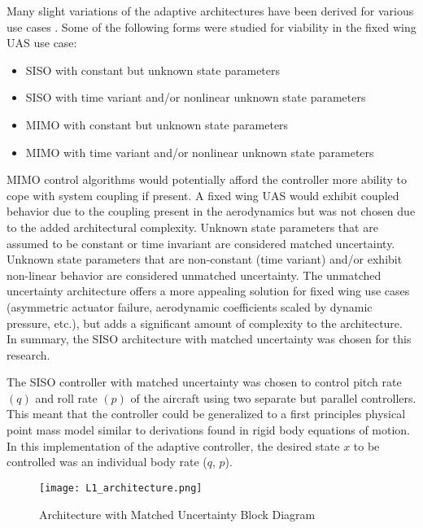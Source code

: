 Many slight variations of the \Lone adaptive architectures have been derived for various use cases \cite{hovakimyan2010l1}.  Some of the following forms were studied for viability in the fixed wing \ac{UAS} use case:
\begin{itemize}
	\item \ac{SISO} with constant but unknown state parameters
	\item \ac{SISO} with time variant and/or nonlinear unknown state parameters
	\item \ac{MIMO} with constant but unknown state parameters
	\item \ac{MIMO} with time variant and/or nonlinear unknown state parameters
\end{itemize}

\ac{MIMO} control algorithms would potentially afford the controller more ability to cope with system coupling if present.  A fixed wing \ac{UAS} would exhibit coupled behavior due to the coupling present in the aerodynamics but was not chosen due to the added architectural complexity.  Unknown state parameters that are assumed to be constant or time invariant are considered matched uncertainty.  Unknown state parameters that are non-constant (time variant) and/or exhibit non-linear behavior are considered unmatched uncertainty.  The unmatched uncertainty architecture offers a more appealing solution for fixed wing use cases (asymmetric actuator failure, aerodynamic coefficients scaled by dynamic pressure, etc.), but adds a significant amount of complexity to the architecture.  In summary, the \ac{SISO} architecture with matched uncertainty was chosen for this research.  

The \ac{SISO} controller with matched uncertainty was chosen to control pitch rate $(q)$ and roll rate $(p)$ of the aircraft using two separate but parallel controllers.  This meant that the controller could be generalized to a first principles physical point mass model similar to derivations found in rigid body equations of motion.  In this implementation of the \Lone adaptive controller, the desired state $x$ to be controlled was an individual body rate (\eg $q$, $p$). 

\begin{figure}[h!]
 \centering
  \texttt{[image: L1\_architecture.png]}
  \caption{\Lone Architecture with Matched Uncertainty Block Diagram \cite{hovakimyan2010l1} }
  \label{fig:l1_architecture}
\end{figure}


